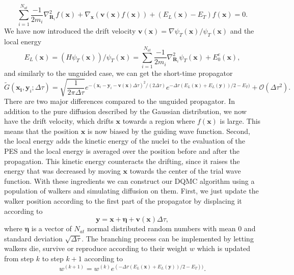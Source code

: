 \documentclass [12pt]{report}
\begin{document}
\begin{equation} \label{eq:2.8}
\sum_{i=1}^{N_{at}} \frac{-1}{2m_i} \nabla^2_{\bm{R}_i} f(\bm{x}) + \nabla_{\bm{x}} (\bm{v}(\bm{x}) f(\bm{x})) + (E_L(\bm{x}) - E_T)f(\bm{x}) = 0.
\end{equation}
We have now introduced the drift velocity $\bm{v}(\bm{x}) = \nabla \psi_T(\bm{x})/ \psi_T(\bm{x})$ and the local energy 
\begin{equation}\label{el}
E_L(\bm{x}) = (H\psi_T(\bm{x}))/\psi_T(\bm{x}) = \sum_{i=1}^{N_{at}} \frac{-1}{2m_i} \nabla^2_{\bm{R}_i} \psi_T(\bm{x}) + E_0^e(\bm{x}),
\end{equation}
and similarly to the unguided case, we can get the short-time propagator
\begin{equation} \label{eq:2.9}
\tilde{G}(\bm{x_i},\bm{y}_i;\Delta \tau) = \sqrt{\frac{1}{2 \pi \Delta \tau}} e^{-(\bm{x}_i-\bm{y}_i-\bm{v}(\bm{x})\Delta \tau)^2 /(2 \Delta \tau)} e^{-\Delta \tau (E_L(\bm{x})+E_L(\bm{y}))/2 - E_T)} + \mathcal{O}(\Delta \tau^2).
\end{equation}
There are two major differences compared to the unguided propagator. In addition to the pure diffusion described by the Gaussian distribution, we now have the drift velocity, which drifts $\bm{x}$ towards a region where $f(\bm{x})$ is large. This means that the position $\bm{x}$ is now biased by the guiding wave function. Second, the local energy adds the kinetic energy of the nuclei to the evaluation of the PES and the local energy is averaged over the position before and after the propagation. This kinetic energy counteracts the drifting, since it raises the energy that was decreased by moving $\bm{x}$ towards the center of the trial wave function.
With these ingredients we can construct our DQMC algorithm using a population of walkers and simulating diffusion on them. First, we just update the walker position according to the first part of the propagator by displacing it according to
\begin{equation}\label{eq:2.10}
\bm{y} = \bm{x} + \bm{\eta} + \bm{v}(\bm{x})\Delta \tau,
\end{equation}
where $\bm{\eta}$ is a vector of $N_{at}$ normal distributed random numbers with mean $0$ and standard deviation $\sqrt{\Delta \tau}$.
The branching process can be implemented by letting walkers die, survive or reproduce according to their weight $w$ which is updated from step $k$ to step $k+1$ according to 
\begin{equation}\label{eq:2.11} 
w^{(k+1)} = w^{(k)} e^{(-\Delta \tau (E_L(\bm{x}) + E_L(\bm{y}))/2 - E_T))}.
\end{equation}
\end{document}
